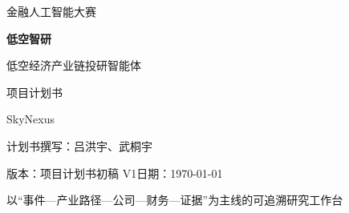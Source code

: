 \thispagestyle{empty}
\begin{center}
\vspace*{22mm}
{\Large 金融人工智能大赛\par}
\vspace{20mm}
{\Huge\bfseries 低空智研\par}
\vspace{7mm}
{\Large 低空经济产业链投研智能体\par}
\vspace{12mm}
{\LARGE 项目计划书\par}
\vspace{14mm}
{\large SkyNexus\par}
\vspace{7mm}
计划书撰写：吕洪宇、武桐宇\par
\vspace{7mm}
版本：项目计划书初稿 V1\quad 日期：\today\par
\end{center}
\vfill
\begin{center}\small
以“事件—产业路径—公司—财务—证据”为主线的可追溯研究工作台
\end{center}
